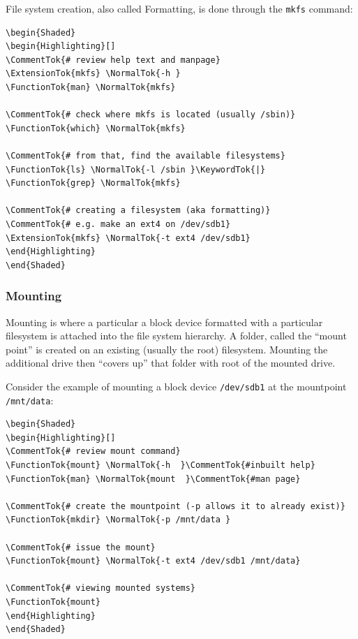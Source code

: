 File system creation, also called Formatting, is done through the
\texttt{mkfs} command:

\begin{verbatim}
\begin{Shaded}
\begin{Highlighting}[]
\CommentTok{# review help text and manpage}
\ExtensionTok{mkfs} \NormalTok{-h }
\FunctionTok{man} \NormalTok{mkfs}

\CommentTok{# check where mkfs is located (usually /sbin)}
\FunctionTok{which} \NormalTok{mkfs}

\CommentTok{# from that, find the available filesystems}
\FunctionTok{ls} \NormalTok{-l /sbin }\KeywordTok{|} \FunctionTok{grep} \NormalTok{mkfs}

\CommentTok{# creating a filesystem (aka formatting)}
\CommentTok{# e.g. make an ext4 on /dev/sdb1}
\ExtensionTok{mkfs} \NormalTok{-t ext4 /dev/sdb1}
\end{Highlighting}
\end{Shaded}
\end{verbatim}

\subsubsection{Mounting}\label{mounting}

Mounting is where a particular a block device formatted with a
particular filesystem is attached into the file system hierarchy. A
folder, called the ``mount point'' is created on an existing (usually
the root) filesystem. Mounting the additional drive then ``covers up''
that folder with root of the mounted drive.

Consider the example of mounting a block device \texttt{/dev/sdb1} at
the mountpoint \texttt{/mnt/data}:

\begin{verbatim}
\begin{Shaded}
\begin{Highlighting}[]
\CommentTok{# review mount command}
\FunctionTok{mount} \NormalTok{-h  }\CommentTok{#inbuilt help}
\FunctionTok{man} \NormalTok{mount  }\CommentTok{#man page}

\CommentTok{# create the mountpoint (-p allows it to already exist)}
\FunctionTok{mkdir} \NormalTok{-p /mnt/data }

\CommentTok{# issue the mount}
\FunctionTok{mount} \NormalTok{-t ext4 /dev/sdb1 /mnt/data}

\CommentTok{# viewing mounted systems}
\FunctionTok{mount}
\end{Highlighting}
\end{Shaded}
\end{verbatim}

